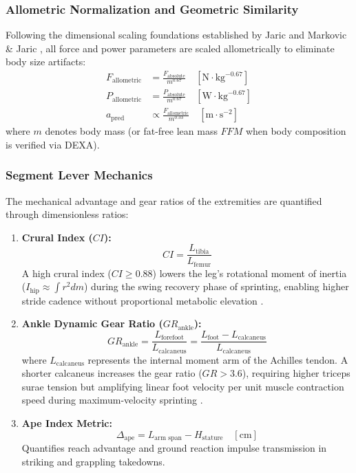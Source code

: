 \documentclass[11pt,a4paper]{article}
\begin{document}
\subsubsection{Allometric Normalization and Geometric Similarity}
Following the dimensional scaling foundations established by Jaric \cite{jaric2002} and Markovic \& Jaric \cite{markovic2004}, all force and power parameters are scaled allometrically to eliminate body size artifacts:
\begin{align}
    F_{\text{allometric}} &= \frac{F_{\text{absolute}}}{m^{0.67}} \quad [\text{N} \cdot \text{kg}^{-0.67}] \\
    P_{\text{allometric}} &= \frac{P_{\text{absolute}}}{m^{0.67}} \quad [\text{W} \cdot \text{kg}^{-0.67}] \\
    a_{\text{pred}} &\propto \frac{F_{\text{allometric}}}{m^{0.33}} \quad [\text{m} \cdot \text{s}^{-2}]
\end{align}
where $m$ denotes body mass (or fat-free lean mass $FFM$ when body composition is verified via DEXA).

\subsubsection{Segment Lever Mechanics}
The mechanical advantage and gear ratios of the extremities are quantified through dimensionless ratios:
\begin{enumerate}
    \item \textbf{Crural Index ($CI$):}
    \begin{equation}
        CI = \frac{L_{\text{tibia}}}{L_{\text{femur}}}
    \end{equation}
    A high crural index ($CI \ge 0.88$) lowers the leg's rotational moment of inertia ($I_{\text{hip}} \approx \int r^2 dm$) during the swing recovery phase of sprinting, enabling higher stride cadence without proportional metabolic elevation \cite{abe2000}.
    
    \item \textbf{Ankle Dynamic Gear Ratio ($GR_{\text{ankle}}$):}
    \begin{equation}
        GR_{\text{ankle}} = \frac{L_{\text{forefoot}}}{L_{\text{calcaneus}}} = \frac{L_{\text{foot}} - L_{\text{calcaneus}}}{L_{\text{calcaneus}}}
    \end{equation}
    where $L_{\text{calcaneus}}$ represents the internal moment arm of the Achilles tendon. A shorter calcaneus increases the gear ratio ($GR > 3.6$), requiring higher triceps surae tension but amplifying linear foot velocity per unit muscle contraction speed during maximum-velocity sprinting \cite{baxter2012}.
    
    \item \textbf{Ape Index Metric:}
    \begin{equation}
        \Delta_{\text{ape}} = L_{\text{arm span}} - H_{\text{stature}} \quad [\text{cm}]
    \end{equation}
    Quantifies reach advantage and ground reaction impulse transmission in striking and grappling takedowns.
\end{enumerate}
\end{document}
